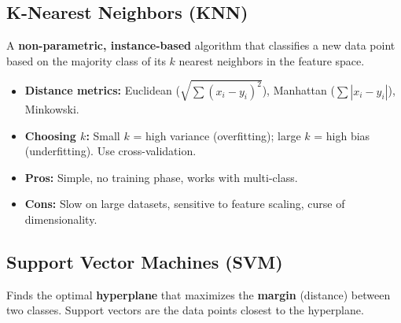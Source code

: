 \documentclass[11pt,a4paper]{article}
\begin{document}
\subsection{K-Nearest Neighbors (KNN)}

\begin{definitionbox}[KNN]
A \textbf{non-parametric, instance-based} algorithm that classifies a new data point based on the majority class of its $k$ nearest neighbors in the feature space.
\end{definitionbox}

\begin{itemize}[leftmargin=*]
  \item \textbf{Distance metrics:} Euclidean ($\sqrt{\sum(x_i - y_i)^2}$), Manhattan ($\sum|x_i - y_i|$), Minkowski.
  \item \textbf{Choosing $k$:} Small $k$ = high variance (overfitting); large $k$ = high bias (underfitting). Use cross-validation.
  \item \textbf{Pros:} Simple, no training phase, works with multi-class.
  \item \textbf{Cons:} Slow on large datasets, sensitive to feature scaling, curse of dimensionality.
\end{itemize}

\subsection{Support Vector Machines (SVM)}

\begin{definitionbox}[SVM]
Finds the optimal \textbf{hyperplane} that maximizes the \textbf{margin} (distance) between two classes. Support vectors are the data points closest to the hyperplane.
\end{definitionbox}
\end{document}
